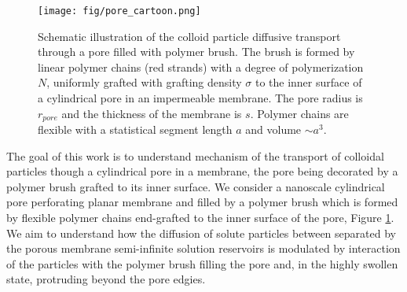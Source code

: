 \documentclass[12pt, a4paper]{article}
\begin{document}
\begin{figure}
    \centering
    \texttt{[image: fig/pore\_cartoon.png]}
    \caption{
        Schematic illustration of the colloid particle diffusive transport through a pore filled with polymer brush. 
        The brush is formed by linear polymer chains (red strands) with a degree of polymerization $N$, uniformly grafted with grafting density $\sigma$  
        to the inner surface of a cylindrical pore in an impermeable membrane. The pore radius is $r_{pore}$ and the thickness of the membrane is $s$.
        Polymer chains are flexible with a statistical segment length $a$ and volume $\sim a^3$.
}
    \label{fig:colloid_transport}
\end{figure}

The goal of this work is to understand mechanism of the transport of colloidal particles though a cylindrical pore in a membrane, 
the pore being decorated by a polymer brush grafted to its inner surface. 
We consider a nanoscale cylindrical pore perforating planar membrane and filled by a polymer brush which is formed  
by flexible polymer chains end-grafted to the inner surface of the pore, Figure \ref{fig:colloid_transport}. 
We aim to understand how the diffusion of solute particles between separated by the porous
membrane semi-infinite solution reservoirs is modulated by interaction of the particles with the 
polymer brush filling the pore and, in the highly swollen state, protruding beyond the pore edgies.
\end{document}

